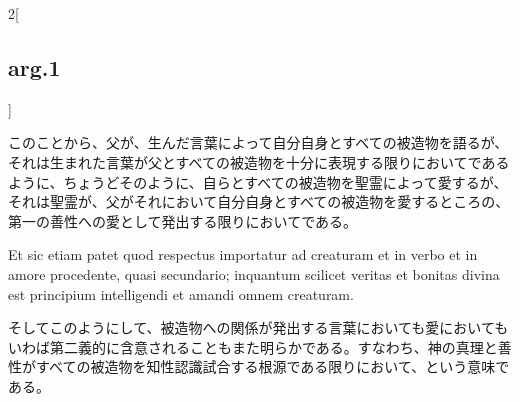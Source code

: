 \documentclass[paper=a4paper,fontsize=10pt,jafontsize=9pt,titlepage]{jlreq}
\begin{document}
\begin{paracol}{2}[\subsection{arg.1}]
\switchcolumn

このことから、父が、生んだ言葉によって自分自身とすべての被造物を語るが、それは生まれた言葉が父とすべての被造物を十分に表現する限りにおいてであるように、ちょうどそのように、自らとすべての被造物を聖霊によって愛するが、それは聖霊が、父がそれにおいて自分自身とすべての被造物を愛するところの、第一の善性への愛として発出する限りにおいてである。

\switchcolumn*

Et
 sic etiam patet quod respectus importatur ad creaturam et in verbo et
 in amore procedente, quasi secundario; inquantum scilicet veritas et
 bonitas divina est principium intelligendi et amandi omnem creaturam.

\switchcolumn

そしてこのようにして、被造物への関係が発出する言葉においても愛においてもいわば第二義的に含意されることもまた明らかである。すなわち、神の真理と善性がすべての被造物を知性認識試合する根源である限りにおいて、という意味である。

\end{paracol}
\end{document}
